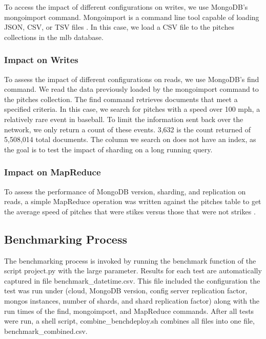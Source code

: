 \documentclass[9pt,twocolumn,twoside]{../../styles/osajnl}
\begin{document}
To access the impact of different configurations on writes, we use
MongoDB's mongoimport command. Mongoimport is a command line tool
capable of loading JSON, CSV, or TSV files \cite{www-mongoimport}. In
this case, we load a CSV file to the pitches collections in the mlb
database.

\subsubsection{Impact on Writes}

To assess the impact of different configurations on reads, we use
MongoDB's find command. We read the data previously loaded by the
mongoimport command to the pitches collection. The find command
retrieves documents that meet a specified criteria. In this case, we
search for pitches with a speed over 100 mph, a relatively rare event
in baseball. To limit the information sent back over the network, we
only return a count of these events. 3,632 is the count returned of
5,508,014 total documents. The column we search on does not have an
index, as the goal is to test the impact of sharding on a long running
query.

\subsubsection{Impact on MapReduce}

To assess the performance of MongoDB version, sharding, and
replication on reads, a simple MapReduce operation was written against
the pitches table to get the average speed of pitches that were stikes
versus those that were not strikes \cite{www-mapreduceEx}
\cite{www-mapreduce}.


\subsection{Benchmarking Process}

The benchmarking process is invoked by running the benchmark function
of the script project.py with the large parameter. Results for each
test are automatically captured in file benchmark\_datetime.csv. This
file included the configuration the test was run under (cloud, MongoDB
version, config server replication factor, mongos instances, number of
shards, and shard replication factor) along with the run times of the
find, mongoimport, and MapReduce commands. After all tests were run, a
shell script, combine\_benchdeploy.sh combines all files into one
file, benchmark\_combined.csv.
\end{document}
